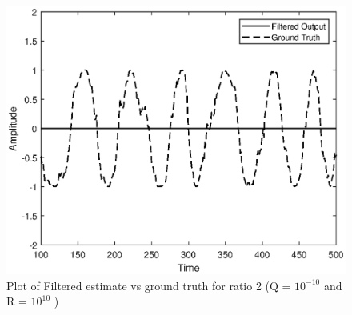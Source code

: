 \documentclass{article}
\begin{document}
\begin{figure}
\centering
\includegraphics[scale=0.50]{ratio2_filt_vs_ground.eps}
\caption{Plot of Filtered estimate vs ground truth for ratio 2 (Q = $10^{-10}$ and R = $10^{10}$ )}
\label{fig:third}
\end{figure}
\end{document}

